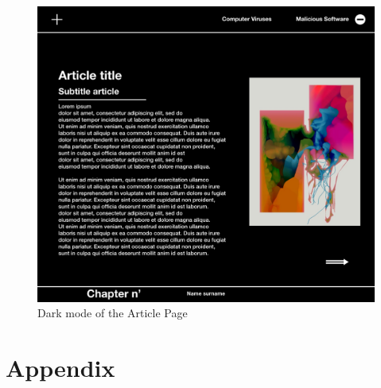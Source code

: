 \documentclass[a4paper,10pt]{article}
\begin{document}
\begin{figure}[p]
\includegraphics[height=0.52\paperheight, center]{darkmode_articletitle.jpeg}
\caption{Dark mode of the Article Page}
\end{figure}




\newpage
\section{Appendix}
\label{sec:Appendix}
\end{document}
